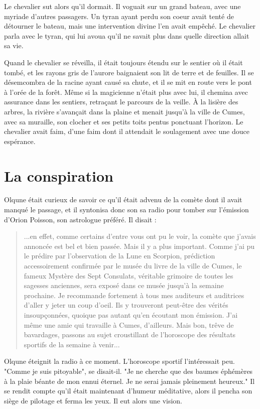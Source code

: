 \documentclass[a4paper,11pt, openany]{book}
\begin{document}
Le chevalier sut alors qu'il dormait. Il voguait sur un grand bateau, avec une myriade d'autres passagers. 
Un tyran ayant perdu son coeur avait tenté de détourner le bateau, mais une intervention divine l'en avait empêché.
Le chevalier parla avec le tyran, qui lui avoua qu'il ne savait plus dans quelle direction allait sa vie.   

Quand le chevalier se réveilla, il était toujours étendu sur le sentier où il était tombé, et les rayons gris de l'aurore
baignaient son lit de terre et de feuilles. Il se désemcombra de la racine ayant causé sa chute, et il se mit en route vers le pont à l'orée de la forêt.
Même si la magicienne n'était plus avec lui, il chemina avec assurance dans les sentiers, retraçant le parcours de la veille.
À la lisière des arbres, la rivière s'avançait dans la plaine et menait jusqu'à la ville de Cumes, avec sa muraille, son clocher et ses petits toits pentus ponctuant l'horizon. 
Le chevalier avait faim, d'une faim dont il attendait le soulagement avec une douce espérance.

\chapter{La conspiration}

Olqune était curieux de savoir ce qu'il était advenu de la comète dont il avait manqué le passage, et il syntonisa donc son sa radio pour tomber sur l'émission d'Orion Poisson, son astrologue préféré.
Il disait : 

\begin{quote}
...en effet, comme certains d'entre vous ont pu le voir, la comète que j'avais annoncée est bel et bien passée. Mais il y a plus important. Comme j'ai pu le prédire par l'observation de la Lune en Scorpion,
prédiction accessoirement confirmée par le musée du livre de la ville de Cumes, le fameux Mystère des Sept Consulats, véritable grimoire de toutes les sagesses anciennes, sera exposé dans ce musée jusqu'à la semaine prochaine.
Je recommande fortement à tous mes auditeurs et auditrices d'aller y jeter un coup d'oeil. Ils y trouveront peut-être des vérités insoupçonnées, quoique pas autant qu'en écoutant mon émission. J'ai même une amie qui travaille à Cumes, d'ailleurs.
Mais bon, trêve de bavardages, passons au sujet croustillant de l'horoscope des résultats sportifs de la semaine à venir...
\end{quote}

Olqune éteignit la radio à ce moment. L'horoscope sportif l'intéressait peu. 
"Comme je suis pitoyable", se disait-il. "Je ne cherche que des baumes éphémères à la plaie béante de mon ennui éternel. Je ne serai jamais pleinement heureux."
Il se rendit compte qu'il était maintenant d'humeur méditative, alors il pencha son siège de pilotage et ferma les yeux.
Il eut alors une vision. 
\end{document}
